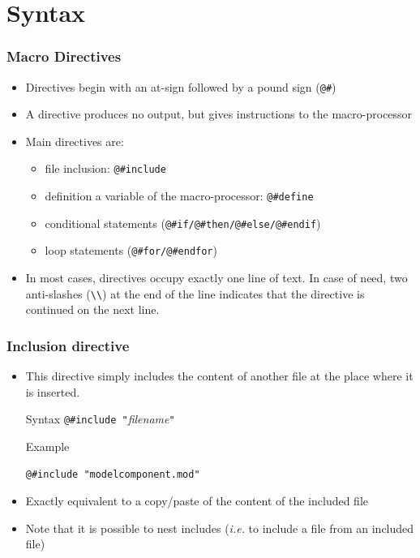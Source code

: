 \documentclass{beamer}
\begin{document}
\section{Syntax}

\begin{frame}[fragile=singleslide]
  \frametitle{Macro Directives}
  \begin{itemize}
  \item Directives begin with an at-sign followed by a pound sign (\verb+@#+)
  \item A directive produces no output, but gives instructions to the macro-processor
  \item Main directives are:
    \begin{itemize}
    \item file inclusion: \verb+@#include+
    \item definition a variable of the macro-processor: \verb+@#define+
    \item conditional statements (\verb+@#if/@#then/@#else/@#endif+)
    \item loop statements (\verb+@#for/@#endfor+)
    \end{itemize}
  \item In most cases, directives occupy exactly one line of text. In case of need, two anti-slashes (\verb+\\+) at the end of the line indicates that the directive is continued on the next line.
  \end{itemize}
\end{frame}

\begin{frame}[fragile=singleslide]
  \frametitle{Inclusion directive}
  \begin{itemize}
  \item This directive simply includes the content of another file at the place where it is inserted.
    \begin{block}{Syntax}
      \verb+@#include "+\textit{filename}\verb+"+
    \end{block}
    \begin{block}{Example}
\begin{verbatim}
@#include "modelcomponent.mod"
\end{verbatim}
    \end{block}
  \item Exactly equivalent to a copy/paste of the content of the included file
  \item Note that it is possible to nest includes (\textit{i.e.} to include a file from an included file)
  \end{itemize}
\end{frame}
\end{document}
